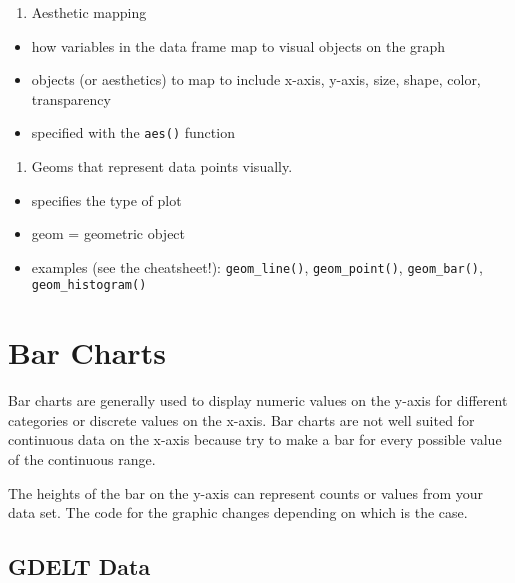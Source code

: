 \documentclass[]{book}
\providecommand{\tightlist}{%
  \setlength{\itemsep}{0pt}\setlength{\parskip}{0pt}}
\theoremstyle{definition}
\theoremstyle{definition}
\theoremstyle{remark}
\begin{document}
\begin{enumerate}
\def\labelenumi{\arabic{enumi}.}
\setcounter{enumi}{1}
\tightlist
\item
  Aesthetic mapping
\end{enumerate}

\begin{itemize}
\tightlist
\item
  how variables in the data frame map to visual objects on the graph
\item
  objects (or aesthetics) to map to include x-axis, y-axis, size, shape,
  color, transparency
\item
  specified with the \texttt{aes()} function
\end{itemize}

\begin{enumerate}
\def\labelenumi{\arabic{enumi}.}
\setcounter{enumi}{2}
\tightlist
\item
  Geoms that represent data points visually.\\
\end{enumerate}

\begin{itemize}
\tightlist
\item
  specifies the type of plot
\item
  geom = geometric object
\item
  examples (see the cheatsheet!): \texttt{geom\_line()},
  \texttt{geom\_point()}, \texttt{geom\_bar()},
  \texttt{geom\_histogram()}
\end{itemize}

\chapter{Bar Charts}\label{bar-charts}

Bar charts are generally used to display numeric values on the y-axis
for different categories or discrete values on the x-axis. Bar charts
are not well suited for continuous data on the x-axis because try to
make a bar for every possible value of the continuous range.

The heights of the bar on the y-axis can represent counts or values from
your data set. The code for the graphic changes depending on which is
the case.

\section{GDELT Data}\label{gdelt-data}
\end{document}
